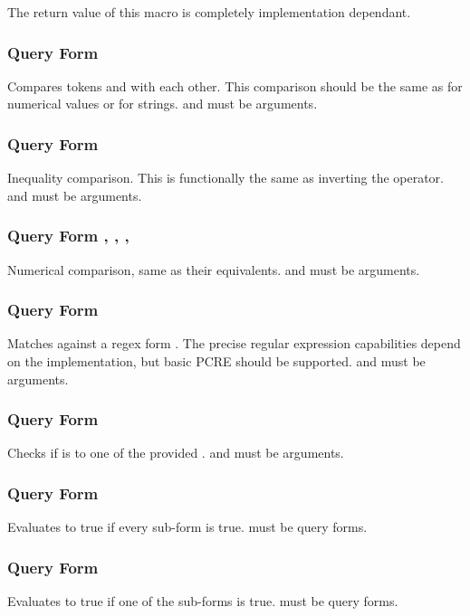 The return value of this macro is completely implementation dependant.
\subsubsection{Query Form \inline{:=}}
Compares tokens  and  with each other. This comparison should be the same as  for numerical values or  for strings.  and  must be arguments.
\subsubsection{Query Form \inline{:!=}}
Inequality comparison. This is functionally the same as inverting the \inline{=} operator.  and  must be arguments.
\subsubsection{Query Form \inline{:>}, \inline{:<}, \inline{:<=}, \inline{:>=}}
Numerical comparison, same as their  equivalents.  and  must be arguments.
\subsubsection{Query Form }
Matches  against a regex form . The precise regular expression capabilities depend on the implementation, but basic PCRE should be supported.
 and  must be arguments.
\subsubsection{Query Form }
Checks if  is \inline{=} to one of the provided .
 and  must be arguments.
\subsubsection{Query Form }
Evaluates to true if every sub-form is true.
 must be query forms.
\subsubsection{Query Form }
Evaluates to true if one of the sub-forms is true.
 must be query forms.
